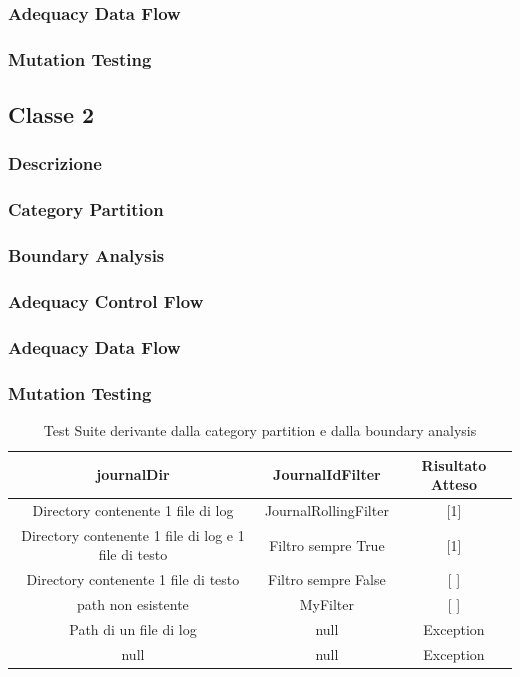\documentclass[12pt, a4paper]{article}
\begin{document}
\subsubsection{Adequacy Data Flow}
\subsubsection{Mutation Testing}

\subsection{Classe 2}
\subsubsection{Descrizione}
\subsubsection{Category Partition}
\subsubsection{Boundary Analysis}
\subsubsection{Adequacy Control Flow}
\subsubsection{Adequacy Data Flow}
\subsubsection{Mutation Testing}













\begin{table}[ht]
  \centering
  \caption[Journal: Test Suite - Category Partition]{Test Suite derivante dalla category partition e dalla boundary analysis}
  \begin{tabular}{|c|c|c|}
  \hline
  journalDir & JournalIdFilter & Risultato Atteso \\
  \hline
  {Directory contenente 1 file di log} & JournalRollingFilter & [1] \\
  {Directory contenente 1 file di log e 1 file di testo} & Filtro sempre True & [1] \\
  {Directory contenente 1 file di testo} & Filtro sempre False & [ ] \\
  {path non esistente} & MyFilter & [ ] \\
  {Path di un file di log} & null & Exception \\
  null & null & Exception \\
  \hline
  \end{tabular}
  \label{tab:categoryPartition1ListJournalIds}
\end{table}
\end{document}
